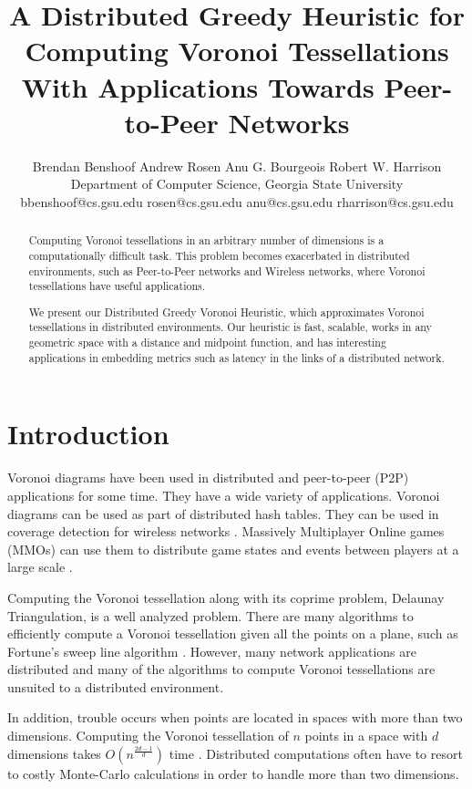 \documentclass[11pt, conference, letterpaper]{IEEEtran}
\title{A Distributed Greedy Heuristic for Computing Voronoi Tessellations With Applications Towards Peer-to-Peer Networks}
\author{Brendan Benshoof \qquad Andrew Rosen \qquad Anu G. Bourgeois \qquad Robert W. Harrison \\Department of Computer Science, Georgia State University\\  bbenshoof@cs.gsu.edu \qquad rosen@cs.gsu.edu \qquad anu@cs.gsu.edu \qquad rharrison@cs.gsu.edu}
\date{} %
\begin{document}
\maketitle

\begin{abstract}
Computing Voronoi tessellations in an arbitrary number of dimensions is a computationally difficult task.
This problem becomes exacerbated in distributed environments, such as Peer-to-Peer networks and Wireless networks, where Voronoi tessellations have useful applications.

We present our Distributed Greedy Voronoi Heuristic, which approximates Voronoi tessellations in distributed environments.
Our heuristic is fast, scalable, works in any geometric space with a distance and midpoint function, and has interesting applications in embedding metrics such as latency in the links of a distributed network.
\end{abstract}


\section{Introduction}
\label{sec:intro}

Voronoi diagrams \cite{voronoi} have been used in distributed and  peer-to-peer (P2P) applications for some time. 
They have a wide variety of applications.
Voronoi diagrams can be used as part of distributed hash tables\cite{virtvoro}.
They can be used in coverage detection for wireless networks \cite{carbunar2004distributed}.
Massively Multiplayer Online games (MMOs) can use them to distribute game states and events between players at a large scale \cite{hu2004scalable} \cite{hu2008voronoi} \cite{Backhaus:2007:VAS:1326257.1326266}.

Computing the Voronoi tessellation along with its coprime problem, Delaunay Triangulation, is a well analyzed problem.
There are many algorithms to efficiently compute a Voronoi tessellation given all the points on a plane, such as Fortune's sweep line algorithm \cite{fortune1987sweepline}.
However, many network applications are distributed and many of the algorithms to compute Voronoi tessellations are unsuited to a distributed environment.

In addition, trouble occurs when points are located in spaces with more than two dimensions.
Computing the Voronoi tessellation of $n$ points in a space with $d$ dimensions takes $O(n^{\frac{2d-1}{d}})$ time \cite{watson1981computing}.
Distributed computations often have to resort to costly Monte-Carlo calculations \cite{raynet} in order to handle more than two dimensions.
\end{document}

